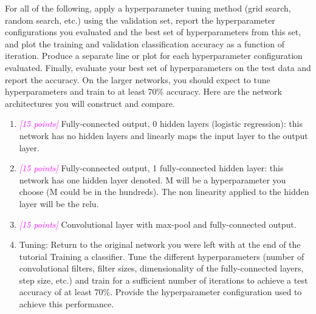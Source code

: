 \documentclass{article}
\newcommand{\1}{\mathbf{1}}
\newcommand{\points}[1]{\small\textcolor{magenta}{\emph{[#1 points]}} \normalsize}
\begin{document}
For all of the following, apply a hyperparameter tuning method (grid search, random search, etc.) using the validation set, report the hyperparameter configurations you evaluated and the best set of hyperparameters from this set, and plot the training and validation classification accuracy as a function of iteration. Produce a separate line or plot for each hyperparameter configuration  evaluated.  Finally, evaluate your best set of hyperparameters on the test data and report the accuracy. On the larger networks, you should expect to tune hyperparameters and train to at least 70\% accuracy. Here are the network architectures you will construct and compare.
\begin{enumerate}
    \item \points{15} Fully-connected output, 0 hidden layers (logistic regression): this network has no hidden layers and linearly maps the input layer to the output layer.
    \item \points{15} Fully-connected output, 1 fully-connected hidden layer: this network has one hidden layer denoted. M will be a hyperparameter you choose (M could be in the hundreds). The non linearity applied to the hidden layer will be the relu.
    \item \points{15} Convolutional layer with max-pool and fully-connected output.
    \item Tuning: Return to the original network you were left with at the end of the tutorial Training a classifier. Tune the different hyperparameters (number of convolutional filters, filter sizes, dimensionality of the fully-connected layers, step size, etc.) and train for a sufficient number of iterations to achieve a test accuracy of at least 70\%. Provide the hyperparameter configuration used to achieve this performance.
\end{enumerate}

  
\end{document}

